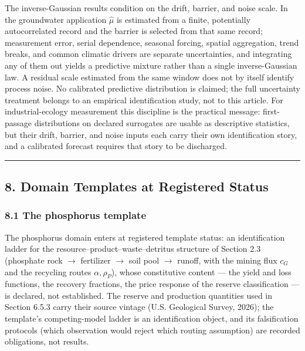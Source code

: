 \documentclass[11pt]{article}
\begin{document}
The inverse-Gaussian results condition on the drift, barrier, and noise
scale. In the groundwater application \(\widehat\mu\) is estimated from
a finite, potentially autocorrelated record and the barrier is selected
from that same record; measurement error, serial dependence, seasonal
forcing, spatial aggregation, trend breaks, and common climatic drivers
are separate uncertainties, and integrating any of them out yields a
predictive mixture rather than a single inverse-Gaussian law. A residual
scale estimated from the same window does not by itself identify process
noise. No calibrated predictive distribution is claimed; the full
uncertainty treatment belongs to an empirical identification study, not
to this article. For industrial-ecology measurement this discipline is
the practical message: first-passage distributions on declared
surrogates are usable as descriptive statistics, but their drift,
barrier, and noise inputs each carry their own identification story, and
a calibrated forecast requires that story to be discharged.

\begin{center}\rule{0.5\linewidth}{0.5pt}\end{center}

\subsection{8. Domain Templates at Registered
Status}\label{domain-templates-at-registered-status}

\subsubsection{8.1 The phosphorus
template}\label{the-phosphorus-template}

The phosphorus domain enters at registered template status: an
identification ladder for the resource--product--waste--detritus
structure of Section 2.3 (phosphate rock \ensuremath{\rightarrow} fertilizer \ensuremath{\rightarrow} soil pool \ensuremath{\rightarrow}
runoff, with the mining flux \(c_G\) and the recycling routes
\(\alpha, \rho_P\)), whose constitutive content --- the yield and loss
functions, the recovery fractions, the price response of the reserve
classification --- is declared, not established. The reserve and
production quantities used in Section 6.5.3 carry their source vintage
(U.S. Geological Survey, 2026); the template's competing-model ladder is
an identification object, and its falsification protocols (which
observation would reject which routing assumption) are recorded
obligations, not results.
\end{document}
